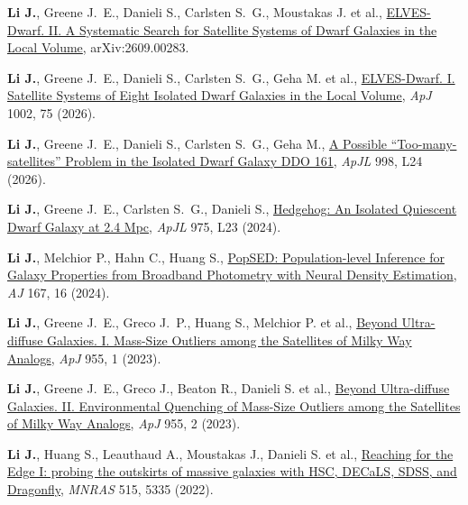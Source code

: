 
\item \textbf{Li J.}, Greene J.~E., Danieli S., Carlsten S.~G., Moustakas J. et al., \href{https://ui.adsabs.harvard.edu/abs/2026arXiv260900283L}{ELVES-Dwarf. II. A Systematic Search for Satellite Systems of Dwarf Galaxies in the Local Volume}, arXiv:2609.00283.

\item \textbf{Li J.}, Greene J.~E., Danieli S., Carlsten S.~G., Geha M. et al., \href{https://ui.adsabs.harvard.edu/abs/2026ApJ..1002...75L}{ELVES-Dwarf. I. Satellite Systems of Eight Isolated Dwarf Galaxies in the Local Volume}, \textit{ApJ} 1002, 75 (2026).

\item \textbf{Li J.}, Greene J.~E., Danieli S., Carlsten S.~G., Geha M., \href{https://ui.adsabs.harvard.edu/abs/2026ApJ...998L..24L}{A Possible ``Too-many-satellites'' Problem in the Isolated Dwarf Galaxy DDO 161}, \textit{ApJL} 998, L24 (2026).

\item \textbf{Li J.}, Greene J.~E., Carlsten S.~G., Danieli S., \href{https://ui.adsabs.harvard.edu/abs/2024ApJ...975L..23L}{Hedgehog: An Isolated Quiescent Dwarf Galaxy at 2.4 Mpc}, \textit{ApJL} 975, L23 (2024).

\item \textbf{Li J.}, Melchior P., Hahn C., Huang S., \href{https://ui.adsabs.harvard.edu/abs/2024AJ....167...16L}{PopSED: Population-level Inference for Galaxy Properties from Broadband Photometry with Neural Density Estimation}, \textit{AJ} 167, 16 (2024).

\item \textbf{Li J.}, Greene J.~E., Greco J.~P., Huang S., Melchior P. et al., \href{https://ui.adsabs.harvard.edu/abs/2023ApJ...955....1L}{Beyond Ultra-diffuse Galaxies. I. Mass-Size Outliers among the Satellites of Milky Way Analogs}, \textit{ApJ} 955, 1 (2023).

\item \textbf{Li J.}, Greene J.~E., Greco J., Beaton R., Danieli S. et al., \href{https://ui.adsabs.harvard.edu/abs/2023ApJ...955....2L}{Beyond Ultra-diffuse Galaxies. II. Environmental Quenching of Mass-Size Outliers among the Satellites of Milky Way Analogs}, \textit{ApJ} 955, 2 (2023).

\item \textbf{Li J.}, Huang S., Leauthaud A., Moustakas J., Danieli S. et al., \href{https://ui.adsabs.harvard.edu/abs/2022MNRAS.515.5335L}{Reaching for the Edge I: probing the outskirts of massive galaxies with HSC, DECaLS, SDSS, and Dragonfly}, \textit{MNRAS} 515, 5335 (2022).

